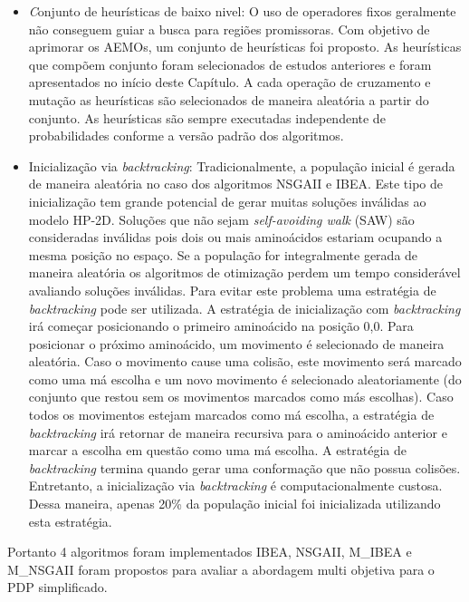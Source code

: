 
 \begin{itemize}
 		
		\item \textit Conjunto de heurísticas de baixo nivel: O uso de operadores fixos geralmente não conseguem guiar a busca para regiões promissoras. 
		Com objetivo de aprimorar os AEMOs, um conjunto de heurísticas foi proposto. As heurísticas que compõem conjunto foram selecionados de estudos anteriores e foram apresentados no início deste Capítulo. A cada operação de cruzamento e mutação as heurísticas são selecionados de maneira aleatória a partir do conjunto. As heurísticas são sempre executadas independente de probabilidades conforme a versão padrão dos algoritmos. 
	
		
		\item Inicialização via \textit{backtracking}: Tradicionalmente, a população inicial é gerada de maneira aleatória no caso dos algoritmos NSGAII e IBEA. Este tipo de inicialização tem grande potencial de gerar muitas soluções inválidas ao  modelo HP-2D. Soluções que não sejam \textit{self-avoiding walk} (SAW) são consideradas inválidas pois dois ou mais aminoácidos estariam ocupando a mesma posição no espaço. Se a população for integralmente gerada de maneira aleatória os algoritmos de otimização perdem um tempo considerável avaliando soluções inválidas. Para evitar este problema uma estratégia de \textit{backtracking} pode ser utilizada. A estratégia de inicialização com \textit{backtracking} irá começar posicionando o primeiro aminoácido na posição 0,0. Para posicionar o próximo aminoácido, um movimento é selecionado de maneira aleatória. Caso o movimento cause uma colisão, este movimento será marcado como uma má escolha e um novo movimento é selecionado aleatoriamente (do conjunto que restou sem os movimentos marcados como más escolhas). Caso todos os movimentos estejam marcados como má escolha, a estratégia de \textit{backtracking} irá retornar de maneira recursiva para o aminoácido anterior e marcar a escolha em questão como uma má escolha. A estratégia de \textit{backtracking} termina quando gerar uma conformação que não possua colisões. Entretanto, a inicialização via \textit{backtracking} é computacionalmente custosa. Dessa maneira, apenas 20\% da população inicial foi inicializada utilizando esta estratégia.

\end{itemize}

Portanto 4 algoritmos foram implementados IBEA, NSGAII, M\_IBEA e M\_NSGAII foram propostos para avaliar a abordagem multi objetiva para o PDP simplificado.


